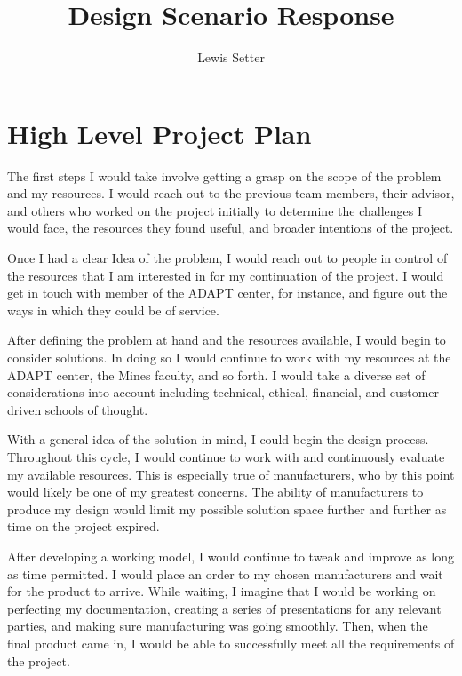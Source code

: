 \documentclass[11pt]{article}
\title{Design Scenario Response}
\author{Lewis Setter}
\begin{document}
\maketitle

\section{High Level Project Plan}\label{project_plan}
The first steps I would take involve getting a grasp on the scope of the problem and
my resources. I would reach out to the previous team members, their advisor, and others
who worked on the project initially to determine the challenges I would face, the 
resources they found useful, and broader intentions of the project.

Once I had a clear Idea of the problem, I would reach out to people in control of the
resources that I am interested in for my continuation of the project. I would get in
touch with member of the ADAPT center, for instance, and figure out the ways in which
they could be of service.

After defining the problem at hand and the resources available, I would begin to consider
solutions. In doing so I would continue to work with my resources at the ADAPT center,
the Mines faculty, and so forth. I would take a diverse set of considerations into
account including technical, ethical, financial, and customer driven schools of thought.

With a general idea of the solution in mind, I could begin the design process.
Throughout this cycle, I would continue to work with and continuously evaluate my
available resources. This is especially true of manufacturers, who by this point would
likely be one of my greatest concerns. The ability of manufacturers to produce my
design would limit my possible solution space further and further as time on the 
project expired.

After developing a working model, I would continue to tweak and improve as long as
time permitted. I would place an order to my chosen manufacturers and wait for the
product to arrive. While waiting, I imagine that I would be working on perfecting my
documentation, creating a series of presentations for any relevant parties, and making
sure manufacturing was going smoothly. Then, when the final product came in, I would
be able to successfully meet all the requirements of the project.
\end{document}
